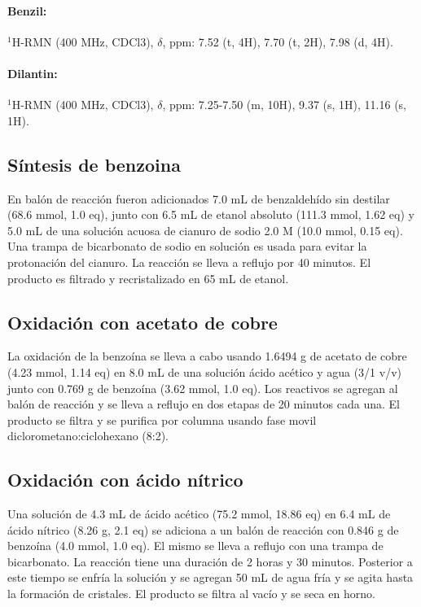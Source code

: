 \documentclass[fleqn,10pt]{SelfArx}
\begin{document}
\paragraph{Benzil:} $^1$H-RMN (400 MHz, CDCl3), $\delta$, ppm: 7.52 (t, 4H), 7.70 (t, 2H), 7.98 (d, 4H). 

\paragraph{Dilantin:} $^1$H-RMN (400 MHz, CDCl3), $\delta$, ppm: 7.25-7.50 (m, 10H), 9.37 (s, 1H), 11.16 (s, 1H). 

\subsection{S\'intesis de benzoina}
En bal\'on de reacci\'on fueron adicionados 7.0 mL de benzaldeh\'ido sin destilar (68.6 mmol, 1.0 eq), junto con 6.5 mL de etanol absoluto (111.3 mmol, 1.62 eq) y 5.0 mL de una soluci\'on acuosa de cianuro de sodio 2.0 M (10.0 mmol, 0.15 eq). Una trampa de bicarbonato de sodio en soluci\'on es usada para evitar la protonaci\'on del cianuro. La reacci\'on se lleva a reflujo por 40 minutos. El producto es filtrado y recristalizado en 65 mL de etanol.

\subsection{Oxidaci\'on con acetato de cobre}
La oxidaci\'on de la benzo\'ina se lleva a cabo usando 1.6494 g de acetato de cobre (4.23 mmol, 1.14 eq) en 8.0 mL de una soluci\'on \'acido ac\'etico y agua (3/1 v/v) junto con 0.769 g de benzo\'ina (3.62 mmol, 1.0 eq). Los reactivos se agregan al bal\'on de reacci\'on y se lleva a reflujo en dos etapas de 20 minutos cada una. El producto se filtra y se purifica por columna usando fase movil diclorometano:ciclohexano (8:2).

\subsection{Oxidaci\'on con \'acido n\'itrico}
Una soluci\'on de 4.3 mL de \'acido ac\'etico (75.2 mmol, 18.86 eq) en 6.4 mL de \'acido n\'itrico (8.26 g, 2.1 eq) se adiciona a un bal\'on de reacci\'on con 0.846 g de benzo\'ina (4.0 mmol, 1.0 eq). El mismo se lleva a reflujo con una trampa de bicarbonato. La reacci\'on tiene una duraci\'on de 2 horas y 30 minutos. Posterior a este tiempo se enfr\'ia la soluci\'on y se agregan 50 mL de agua fr\'ia y se agita hasta la formaci\'on de cristales. El producto se filtra al vac\'io y se seca en horno.
\end{document}

